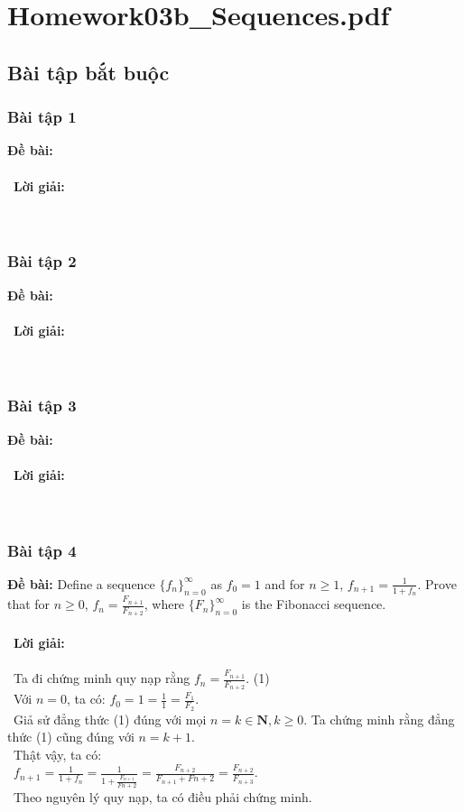 \documentclass[a4paper]{article}
\begin{document}
\section{Homework03b\_Sequences.pdf}
\subsection{Bài tập bắt buộc}
\subsubsection{Bài tập 1}
\textbf{Đề bài:} 
\\\ \\\
\textbf{Lời giải:} \\\ \\\
\clearpage
\subsubsection{Bài tập 2}
\textbf{Đề bài:} 
\\\ \\\
\textbf{Lời giải:} \\\ \\\
\clearpage
\subsubsection{Bài tập 3}
\textbf{Đề bài:} 
\\\ \\\
\textbf{Lời giải:} \\\ \\\
\clearpage
\subsubsection{Bài tập 4}
\textbf{Đề bài: }Define a sequence $\{f_n\}_{n=0}^\infty$ as $f_0 = 1$ and for $n \geq 1$, $f_{n+1} = \frac{1}{1+f_n}$. Prove that for $n \geq 0$, $f_n = \frac{F_{n+1}}{F_{n+2}}$, where $\{F_n\}_{n=0}^\infty$ is the Fibonacci sequence. \\\ \\\
\textbf{Lời giải: } \\\ \\\
Ta đi chứng minh quy nạp rằng $f_n = \frac{F_{n+1}}{F_{n+2}}$. (1)\\\
Với $n = 0$, ta có: $f_0 = 1 = \frac{1}{1} = \frac{F_1}{F_2}$. \\\
Giả sử đẳng thức (1) đúng với mọi $n = k \in \textbf{N}, k \geq 0$.
Ta chứng minh rằng đẳng thức (1) cũng đúng với $n = k+1$.\\\
Thật vậy, ta có: \\\
$f_{n+1} = \frac{1}{1+f_n} = \frac{1}{1+\frac{F_{n+1}}{F{n+2}}} = \frac{F_{n+2}}{F_{n+1} + F{n+2}} = \frac{F_{n+2}}{F_{n+3}}$. \\\
Theo nguyên lý quy nạp, ta có điều phải chứng minh.
\clearpage
\end{document}
